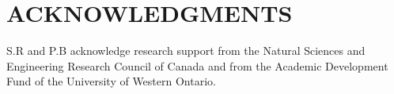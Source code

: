 \documentclass[useAMS,usenatbib]{mn2e}
\begin{document}
\section*{ACKNOWLEDGMENTS}
S.R and P.B acknowledge research support from the Natural Sciences and Engineering Research Council of Canada and from the Academic Development Fund of the University of Western Ontario.


\end{document}
